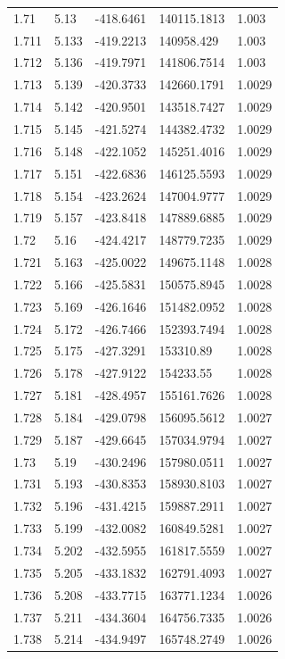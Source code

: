 \begin{tabular}{lllll}
1.71 & 5.13 & -418.6461 & 140115.1813 & 1.003 \\
1.711 & 5.133 & -419.2213 & 140958.429 & 1.003 \\
1.712 & 5.136 & -419.7971 & 141806.7514 & 1.003 \\
1.713 & 5.139 & -420.3733 & 142660.1791 & 1.0029 \\
1.714 & 5.142 & -420.9501 & 143518.7427 & 1.0029 \\
1.715 & 5.145 & -421.5274 & 144382.4732 & 1.0029 \\
1.716 & 5.148 & -422.1052 & 145251.4016 & 1.0029 \\
1.717 & 5.151 & -422.6836 & 146125.5593 & 1.0029 \\
1.718 & 5.154 & -423.2624 & 147004.9777 & 1.0029 \\
1.719 & 5.157 & -423.8418 & 147889.6885 & 1.0029 \\
1.72 & 5.16 & -424.4217 & 148779.7235 & 1.0029 \\
1.721 & 5.163 & -425.0022 & 149675.1148 & 1.0028 \\
1.722 & 5.166 & -425.5831 & 150575.8945 & 1.0028 \\
1.723 & 5.169 & -426.1646 & 151482.0952 & 1.0028 \\
1.724 & 5.172 & -426.7466 & 152393.7494 & 1.0028 \\
1.725 & 5.175 & -427.3291 & 153310.89 & 1.0028 \\
1.726 & 5.178 & -427.9122 & 154233.55 & 1.0028 \\
1.727 & 5.181 & -428.4957 & 155161.7626 & 1.0028 \\
1.728 & 5.184 & -429.0798 & 156095.5612 & 1.0027 \\
1.729 & 5.187 & -429.6645 & 157034.9794 & 1.0027 \\
1.73 & 5.19 & -430.2496 & 157980.0511 & 1.0027 \\
1.731 & 5.193 & -430.8353 & 158930.8103 & 1.0027 \\
1.732 & 5.196 & -431.4215 & 159887.2911 & 1.0027 \\
1.733 & 5.199 & -432.0082 & 160849.5281 & 1.0027 \\
1.734 & 5.202 & -432.5955 & 161817.5559 & 1.0027 \\
1.735 & 5.205 & -433.1832 & 162791.4093 & 1.0027 \\
1.736 & 5.208 & -433.7715 & 163771.1234 & 1.0026 \\
1.737 & 5.211 & -434.3604 & 164756.7335 & 1.0026 \\
1.738 & 5.214 & -434.9497 & 165748.2749 & 1.0026 \\

\end{tabular}
